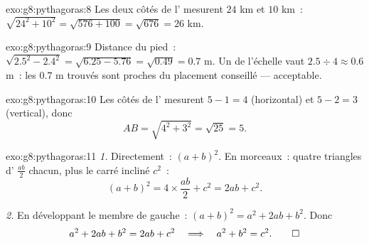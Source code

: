 \begin{solution}{exo:g8:pythagoras:8}
Les deux côtés de l' mesurent $24$ km et $10$ km~:
$\sqrt{24^2 + 10^2} = \sqrt{576 + 100} = \sqrt{676} = 26$ km.
\end{solution}

\begin{solution}{exo:g8:pythagoras:9}
Distance du pied~: $\sqrt{2.5^2 - 2.4^2} = \sqrt{6.25 - 5.76} =
\sqrt{0.49} = 0.7$ m. Un  de l'échelle vaut
$2.5 \div 4 \approx 0.6$ m~: les $0.7$ m trouvés sont proches du
placement conseillé --- acceptable.
\end{solution}

\begin{solution}{exo:g8:pythagoras:10}
Les côtés de l' mesurent $5 - 1 = 4$ (horizontal) et
$5 - 2 = 3$ (vertical), donc
\[
AB = \sqrt{4^2 + 3^2} = \sqrt{25} = 5 .
\]
\end{solution}

\begin{solution}{exo:g8:pythagoras:11}
\emph{1.} Directement~: $(a + b)^2$. En morceaux~: quatre triangles
d' $\frac{ab}{2}$ chacun, plus le carré incliné $c^2$~:
\[
(a + b)^2 = 4 \times \frac{ab}{2} + c^2 = 2ab + c^2 .
\]

\emph{2.} En développant le membre de gauche~:
$(a+b)^2 = a^2 + 2ab + b^2$. Donc
\[
a^2 + 2ab + b^2 = 2ab + c^2
\quad\Longrightarrow\quad
a^2 + b^2 = c^2 . \qed
\]
\end{solution}

